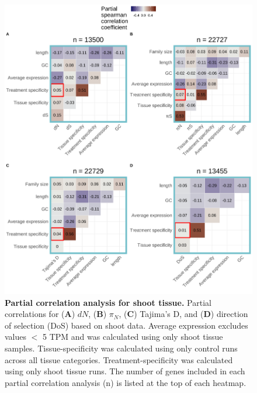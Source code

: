 \documentclass[12pt]{article}
\begin{document}
\begin{figure}[H]
\centering
\includegraphics[width = \linewidth]{figures/appendix_a/partialCorrelations_withTissueSpecificity_shoot_2023-02-20.pdf}
\caption{\textbf{Partial correlation analysis for shoot tissue.} Partial correlations for (\textbf{A}) $dN$, (\textbf{B}) $\pi_N$, (\textbf{C}) Tajima's D, and (\textbf{D}) direction of selection (DoS) based on shoot data. Average expression excludes values $<$ 5 TPM and was calculated using only shoot tissue samples. Tissue-specificity was calculated using only control runs across all tissue categories. Treatment-specificity was calculated using only shoot tissue runs. The number of genes included in each partial correlation analysis (n) is listed at the top of each heatmap.}%
\end{figure}

\newpage
\end{document}

